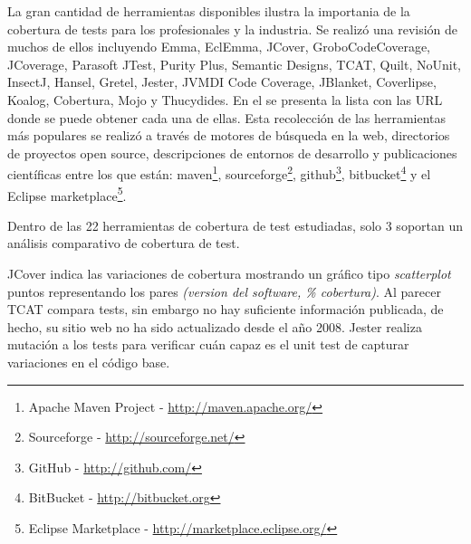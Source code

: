 \par La gran cantidad de herramientas disponibles ilustra la importania de la cobertura de tests para los profesionales y la industria. Se realizó una revisión de muchos de ellos incluyendo Emma, EclEmma, JCover, GroboCodeCoverage, JCoverage, Parasoft JTest, Purity Plus, Semantic Designs, TCAT, Quilt, NoUnit, InsectJ, Hansel, Gretel, Jester, JVMDI Code Coverage, JBlanket, Coverlipse, Koalog, Cobertura, Mojo y Thucydides. En el  se presenta la lista con las URL donde se puede obtener cada una de ellas. Esta recolección de las herramientas más populares se realizó a través de motores de búsqueda en la web, directorios de proyectos open source, descripciones de entornos de desarrollo y publicaciones científicas entre los que están: maven\footnote{Apache Maven Project - \url{http://maven.apache.org/}}, sourceforge\footnote{Sourceforge - \url{http://sourceforge.net/}}, github\footnote{GitHub - \url{http://github.com/}}, bitbucket\footnote{BitBucket - \url{http://bitbucket.org}} y el Eclipse marketplace\footnote{Eclipse Marketplace - \url{http://marketplace.eclipse.org/}}. 

\par Dentro de las 22 herramientas de cobertura de test estudiadas, solo 3 soportan un análisis comparativo de cobertura de test. 
\par JCover indica las variaciones de cobertura mostrando un gráfico tipo \emph{scatterplot} puntos representando los pares \emph{(version del software, \% cobertura)}. Al parecer TCAT compara tests, sin embargo no hay suficiente información publicada, de hecho, su sitio web no ha sido actualizado desde el año 2008. Jester realiza mutación a los tests para verificar cuán capaz es el unit test de capturar variaciones en el código base.

